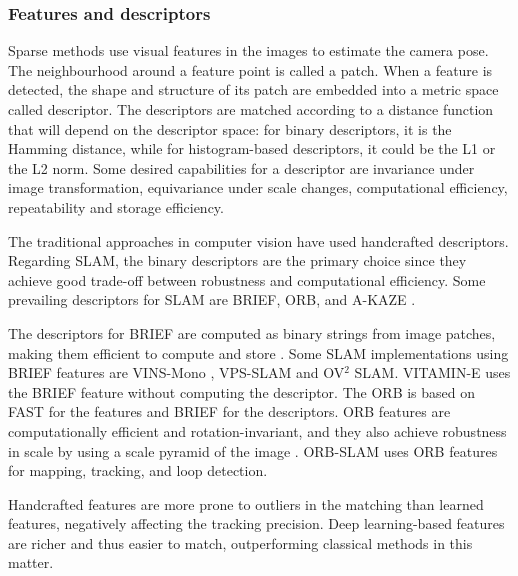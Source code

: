 \subsubsection{Features and descriptors\label{section:features-descriptors}}
Sparse methods use visual features in the images to estimate the camera pose. The neighbourhood around a feature point is called a patch. When a feature is detected, the shape and structure of its patch are embedded into a metric space called descriptor. The descriptors are matched according to a distance function that will depend on the descriptor space: for binary descriptors, it is the Hamming distance, while for histogram-based descriptors, it could be the L1 or the L2 norm. 
Some desired capabilities for a descriptor are invariance under image transformation, equivariance under scale changes, computational efficiency, repeatability and storage efficiency.

The traditional approaches in computer vision have used handcrafted descriptors. Regarding SLAM, the binary descriptors are the primary choice since they achieve good trade-off between robustness and computational efficiency. Some prevailing descriptors for SLAM are \ac{BRIEF}\cite{calonder2011brief}, \ac{ORB}\cite{rublee2011orb}, and A-KAZE \cite{alcantarilla2011AKAZE}.




The  descriptors for \ac{BRIEF} are computed as binary strings from image patches, making them efficient to compute and store \cite{calonder2011brief}. 
Some SLAM implementations using \ac{BRIEF} features are VINS-Mono \cite{qin2018vins-mono}, VPS-SLAM \cite{bavle2020vps-slam} and OV$^2$ SLAM\cite{ferrera2021ov2slam}. VITAMIN-E \cite{Yokozuka_2019vitamine} uses the BRIEF feature without computing the descriptor.
The \ac{ORB} is based on FAST for the features and BRIEF for the descriptors. \ac{ORB} features are computationally efficient and rotation-invariant, and they also achieve robustness in scale by using a scale pyramid of the image \cite{rublee2011orb}. ORB-SLAM \cite{mur2015orb} uses \ac{ORB} features for mapping, tracking, and loop detection. 


Handcrafted features are more prone to outliers in the matching than learned features, negatively affecting the tracking precision. Deep learning-based features are richer and thus easier to match, outperforming classical methods in this matter. 



